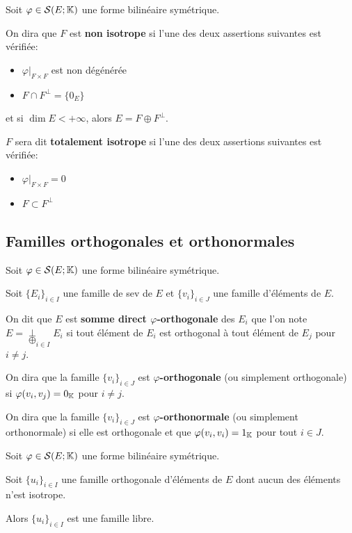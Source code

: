 \documentclass[a4paper, 12pt]{article}
\begin{document}
\begin{definition}
    Soit $\varphi \in \mathcal{S}(E; \mathbb{K})$ une forme bilinéaire symétrique.

    On dira que $F$ est \textbf{non isotrope} si l'une des deux assertions suivantes est vérifiée:
    \begin{itemize}
        \item $\varphi|_{F \times F}$ est non dégénérée
        \item $F \cap F^\perp = \{0_E\}$
    \end{itemize}

    et si $\dim E < +\infty$, alors $E = F \oplus F^\perp$.

    $F$ sera dit \textbf{totalement isotrope} si l'une des deux assertions suivantes est vérifiée:
    \begin{itemize}
        \item $\varphi|_{F \times F} = 0$
        \item $F \subset F^\perp$
    \end{itemize}
\end{definition}

\subsection{Familles orthogonales et orthonormales}

\begin{definition}
    Soit $\varphi \in \mathcal{S}(E; \mathbb{K})$ une forme bilinéaire symétrique.

    Soit $\{E_i\}_{i \in I}$ une famille de sev de $E$ et $\{v_i\}_{i \in J}$ une famille d'éléments de $E$.

    On dit que $E$ est \textbf{somme direct $\varphi$-orthogonale} des $E_i$ que l'on note $E = \underset{\bigoplus}{\perp}_{i \in I} E_i$ 
    si tout élément de $E_i$ est orthogonal à tout élément de $E_j$ pour $i \neq j$.

    On dira que la famille $\{v_i\}_{i \in J}$ est \textbf{$\varphi$-orthogonale} (ou simplement orthogonale) si $\varphi(v_i, v_j) = 0_{\mathbb{K}}$ pour $i \neq j$.

    On dira que la famille $\{v_i\}_{i \in J}$ est \textbf{$\varphi$-orthonormale} (ou simplement orthonormale) si elle est orthogonale et que $\varphi(v_i, v_i) = 1_{\mathbb{K}}$ pour tout $i \in J$.
\end{definition}

\begin{proposition}{}{}
    Soit $\varphi \in \mathcal{S}(E; \mathbb{K})$ une forme bilinéaire symétrique.

    Soit $\{u_i\}_{i \in I}$ une famille orthogonale d'éléments de $E$ dont aucun des éléments n'est isotrope.

    Alors $\{u_i\}_{i \in I}$ est une famille libre.
\end{proposition}
\end{document}
